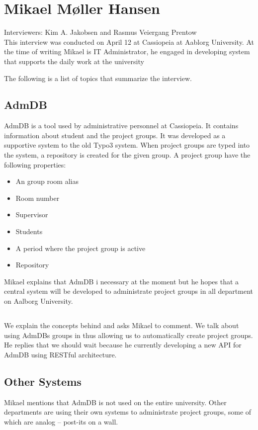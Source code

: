 
\section{Mikael Møller Hansen}
\label{sec:mikael}
Interviewers: Kim A. Jakobsen and Rasmus Veiergang Prentow\\

This interview was conducted on April 12\ths{} at Cassiopeia at Aablorg University.
At the time of writing Mikael is IT Administrator, he engaged in developing system that supports the daily work at the university

The following is a list of topics that summarize the interview.

\subsection*{AdmDB}
AdmDB is a tool used by administrative personnel at Cassiopeia.
It contains information about student and the project groups.
It was developed as a supportive system to the old Typo3 system. When project groups are typed into the system, a repository is created for the given group. A project group have the following properties:
\begin{itemize}
	\item An group room alias
	\item Room number
	\item Supervisor
	\item Students
	\item A period where the project group is active
	\item Repository
\end{itemize}

Mikael explains that AdmDB i necessary at the moment but he hopes that a central system will be developed to administrate project groups in all department on Aalborg University. 

\subsection*{\system{}}
We explain the concepts behind \system{} and asks Mikael to comment. 
We talk about using AdmDBs groups in \system{} thus allowing us to automatically create project groups. 
He replies that we should wait because he currently developing a new API for AdmDB using RESTful architecture. 

\subsection*{Other Systems}
Mikael mentions that AdmDB is not used on the entire university.
Other departments are using their own systems to administrate project groups, some of which are analog -- post-its on a wall.